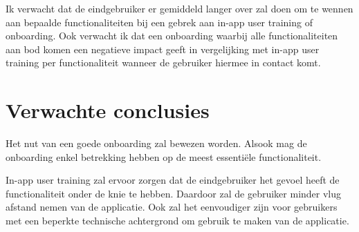 Ik verwacht dat de eindgebruiker er gemiddeld langer over zal doen om te wennen aan bepaalde functionaliteiten bij een gebrek aan in-app user training of onboarding. Ook verwacht ik dat een onboarding waarbij alle functionaliteiten aan bod komen een negatieve impact geeft in vergelijking met in-app user training per functionaliteit wanneer de gebruiker hiermee in contact komt.

\section{Verwachte conclusies}
\label{sec:verwachte_conclusies}

Het nut van een goede onboarding zal bewezen worden. Alsook mag de onboarding enkel betrekking hebben op de meest essentiële functionaliteit.

In-app user training zal ervoor zorgen dat de eindgebruiker het gevoel heeft de functionaliteit onder de knie te hebben. Daardoor zal de gebruiker minder vlug afstand nemen van de applicatie. Ook zal het eenvoudiger zijn voor gebruikers met een beperkte technische achtergrond om gebruik te maken van de applicatie.

